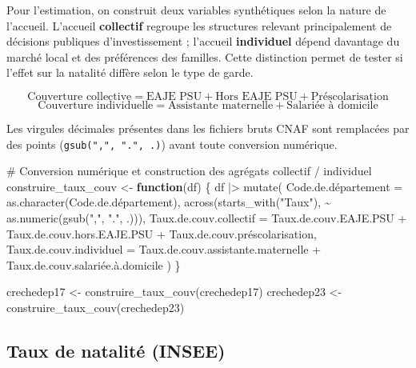 \documentclass[
  letterpaper,
  DIV=11,
  numbers=noendperiod]{scrartcl}
\newenvironment{Shaded}{\begin{snugshade}}{\end{snugshade}}
\newcommand{\AttributeTok}[1]{\textcolor[rgb]{0.40,0.45,0.13}{#1}}
\newcommand{\CommentTok}[1]{\textcolor[rgb]{0.37,0.37,0.37}{#1}}
\newcommand{\ControlFlowTok}[1]{\textcolor[rgb]{0.00,0.23,0.31}{\textbf{#1}}}
\newcommand{\FunctionTok}[1]{\textcolor[rgb]{0.28,0.35,0.67}{#1}}
\newcommand{\NormalTok}[1]{\textcolor[rgb]{0.00,0.23,0.31}{#1}}
\newcommand{\OtherTok}[1]{\textcolor[rgb]{0.00,0.23,0.31}{#1}}
\newcommand{\SpecialCharTok}[1]{\textcolor[rgb]{0.37,0.37,0.37}{#1}}
\newcommand{\StringTok}[1]{\textcolor[rgb]{0.13,0.47,0.30}{#1}}
\begin{document}
Pour l'estimation, on construit deux variables synthétiques selon la
nature de l'accueil. L'accueil \textbf{collectif} regroupe les
structures relevant principalement de décisions publiques
d'investissement ; l'accueil \textbf{individuel} dépend davantage du
marché local et des préférences des familles. Cette distinction permet
de tester si l'effet sur la natalité diffère selon le type de garde.

\[\text{Couverture collective} = \text{EAJE PSU} + \text{Hors EAJE PSU} + \text{Préscolarisation}\]
\[\text{Couverture individuelle} = \text{Assistante maternelle} + \text{Salariée à domicile}\]

Les virgules décimales présentes dans les fichiers bruts CNAF sont
remplacées par des points (\texttt{gsub(",",\ ".",\ .)}) avant toute
conversion numérique.

\begin{Shaded}
\begin{Highlighting}[]
\CommentTok{\# Conversion numérique et construction des agrégats collectif / individuel}
\NormalTok{construire\_taux\_couv }\OtherTok{\textless{}{-}} \ControlFlowTok{function}\NormalTok{(df) \{}
\NormalTok{  df }\SpecialCharTok{|\textgreater{}}
    \FunctionTok{mutate}\NormalTok{(}
\NormalTok{      Code.de.département }\OtherTok{=} \FunctionTok{as.character}\NormalTok{(Code.de.département),}
      \FunctionTok{across}\NormalTok{(}\FunctionTok{starts\_with}\NormalTok{(}\StringTok{"Taux"}\NormalTok{), }\SpecialCharTok{\textasciitilde{}} \FunctionTok{as.numeric}\NormalTok{(}\FunctionTok{gsub}\NormalTok{(}\StringTok{","}\NormalTok{, }\StringTok{"."}\NormalTok{, .))),}
      \AttributeTok{Taux.de.couv.collectif  =}\NormalTok{ Taux.de.couv.EAJE.PSU }\SpecialCharTok{+}
\NormalTok{                                 Taux.de.couv.hors.EAJE.PSU }\SpecialCharTok{+}
\NormalTok{                                 Taux.de.couv.préscolarisation,}
      \AttributeTok{Taux.de.couv.individuel =}\NormalTok{ Taux.de.couv.assistante.maternelle }\SpecialCharTok{+}
\NormalTok{                                 Taux.de.couv.salariée.à.domicile}
\NormalTok{    )}
\NormalTok{\}}

\NormalTok{crechedep17 }\OtherTok{\textless{}{-}} \FunctionTok{construire\_taux\_couv}\NormalTok{(crechedep17)}
\NormalTok{crechedep23 }\OtherTok{\textless{}{-}} \FunctionTok{construire\_taux\_couv}\NormalTok{(crechedep23)}
\end{Highlighting}
\end{Shaded}

\subsection{Taux de natalité (INSEE)}\label{taux-de-natalituxe9-insee}
\end{document}
